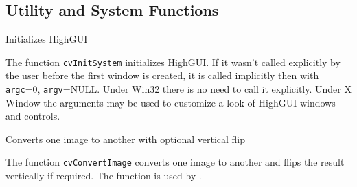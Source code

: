 \subsection{Utility and System Functions}


Initializes HighGUI


\begin{description}
\end{description}

The function \texttt{cvInitSystem} initializes HighGUI. If it wasn't
called explicitly by the user before the first window is created, it is
called implicitly then with \texttt{argc}=0, \texttt{argv}=NULL. Under
Win32 there is no need to call it explicitly. Under X Window the arguments
may be used to customize a look of HighGUI windows and controls.


Converts one image to another with optional vertical flip


\begin{description}
\end{description}

The function \texttt{cvConvertImage} converts one image to another and flips the result vertically if required. The function is used by .
